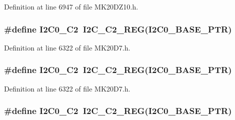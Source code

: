 Definition at line 6947 of file M\+K20\+D\+Z10.\+h.

\subsubsection[{\texorpdfstring{I2\+C0\+\_\+\+C2}{I2C0_C2}}]{\setlength{\rightskip}{0pt plus 5cm}\#define I2\+C0\+\_\+\+C2~{\bf I2\+C\+\_\+\+C2\+\_\+\+R\+EG}({\bf I2\+C0\+\_\+\+B\+A\+S\+E\+\_\+\+P\+TR})}\hypertarget{group___i2_c___register___accessor___macros_gaeff876311aea33455ceb8ef9fb50b4c7}{}\label{group___i2_c___register___accessor___macros_gaeff876311aea33455ceb8ef9fb50b4c7}


Definition at line 6322 of file M\+K20\+D7.\+h.

\subsubsection[{\texorpdfstring{I2\+C0\+\_\+\+C2}{I2C0_C2}}]{\setlength{\rightskip}{0pt plus 5cm}\#define I2\+C0\+\_\+\+C2~{\bf I2\+C\+\_\+\+C2\+\_\+\+R\+EG}({\bf I2\+C0\+\_\+\+B\+A\+S\+E\+\_\+\+P\+TR})}\hypertarget{group___i2_c___register___accessor___macros_gaeff876311aea33455ceb8ef9fb50b4c7}{}\label{group___i2_c___register___accessor___macros_gaeff876311aea33455ceb8ef9fb50b4c7}


Definition at line 6322 of file M\+K20\+D7.\+h.

\subsubsection[{\texorpdfstring{I2\+C0\+\_\+\+C2}{I2C0_C2}}]{\setlength{\rightskip}{0pt plus 5cm}\#define I2\+C0\+\_\+\+C2~{\bf I2\+C\+\_\+\+C2\+\_\+\+R\+EG}({\bf I2\+C0\+\_\+\+B\+A\+S\+E\+\_\+\+P\+TR})}\hypertarget{group___i2_c___register___accessor___macros_gaeff876311aea33455ceb8ef9fb50b4c7}{}\label{group___i2_c___register___accessor___macros_gaeff876311aea33455ceb8ef9fb50b4c7}


